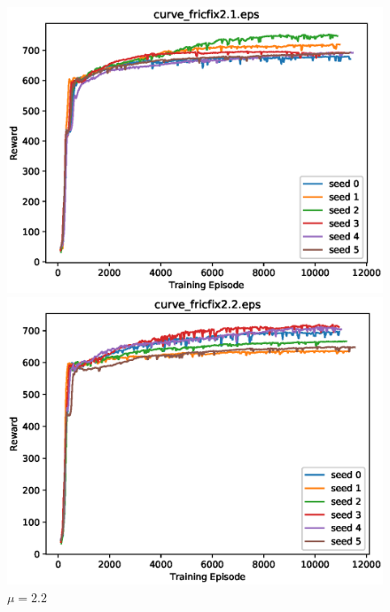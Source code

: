 \clearpage

\begin{figure}[p]
 \begin{minipage}{0.49\hsize}
  \begin{center}
 \includegraphics[width=.99\linewidth]{./fig/curve_fricfix2.1.eps}
  \caption{$\mu=2.1$
  }
  \end{center}
 \end{minipage}
 \begin{minipage}{0.49\hsize}
   \begin{center}
 \includegraphics[width=.99\linewidth]{./fig/curve_fricfix2.2.eps}
  \caption{$\mu=2.2$
     }
  \end{center}
 \end{minipage}
\end{figure}

